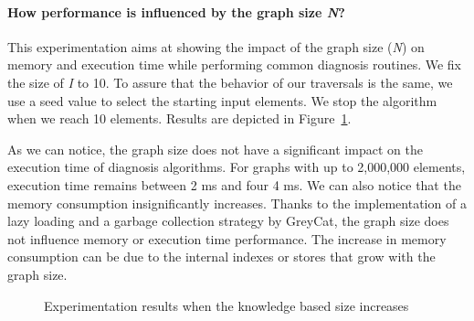 \paragraph{How performance is influenced by the graph size \textit{N}?}
This experimentation aims at showing the impact of the graph size (\textit{N}) on memory and execution time while performing common diagnosis routines.
We fix the size of \textit{I} to 10. To assure that the behavior of our traversals is the same, we use a seed value to select the starting input elements. We stop the algorithm when we reach 10 elements.
Results are depicted in Figure~\ref{fig:exp1}.

As we can notice, the graph size does not have a significant impact on the execution time of diagnosis algorithms.
For graphs with up to 2,000,000 elements, execution time remains between 2 ms and four 4 ms. We can also notice that the memory consumption insignificantly increases.
Thanks to the implementation of a lazy loading and a garbage collection strategy by GreyCat, the graph size does not influence memory or execution time performance. The increase in memory consumption can be due to the internal indexes or stores that grow with the graph size.

\begin{figure}
	\centering
	\hfil
	\caption{Experimentation results when the knowledge based size increases}
	\label{fig:exp1}
\end{figure}

